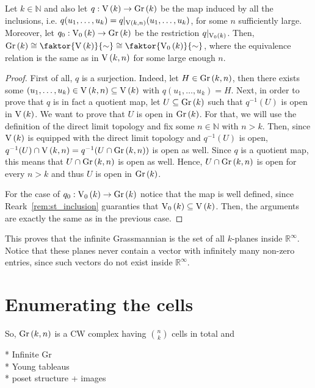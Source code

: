 \begin{proposition} Let $k\in\mathbb{N}$ and also let $q:\St{k}\to\Gr{k}$ be the map induced by all the inclusions, i.e. $q(u_1,\ldots,u_k)=q|_{\St{k}{n}}(u_1,\ldots,u_k)$, for some $n$ sufficiently large. Moreover, let $q_0:\StO{k}\to\Gr{k}$ be the restriction $q|_{\StO{k}}$. Then, $\Gr{k}\cong\faktor{\St{k}}{\sim}\cong\faktor{\StO{k}}{\sim}$, where the equivalence relation is the same as in $\St{k}{n}$ for some large enough $n$.
\end{proposition}
\begin{proof} First of all, $q$ is a surjection. Indeed, let $H\in\Gr{k}{n}$, then there exists some $(u_1,\ldots,u_k)\in\St{k}{n}\subseteq\St{k}$ with $q(u_1,\ldots,u_k)=H$. Next, in order to prove that $q$ is in fact a quotient map, let $U\subseteq\Gr{k}$ such that $q^{-1}(U)$ is open in $\St{k}$. We want to prove that $U$ is open in $\Gr{k}$. For that, we will use the definition of the direct limit topology and fix some $n\in\mathbb{N}$ with $n>k$. Then, since $\St{k}$ is equipped with the direct limit topology and $q^{-1}(U)$ is open, $q^{-1}(U)\cap\St{k}{n}=q^{-1}(U\cap\Gr{k}{n})$ is open as well. Since $q$ is a quotient map, this means that $U\cap\Gr{k}{n}$ is open as well. Hence, $U\cap\Gr{k}{n}$ is open for every $n>k$ and thus $U$ is open in $\Gr{k}$.

For the case of $q_0:\StO{k}\to\Gr{k}$ notice that the map is well defined, since Reark~\ref{rem:st_inclusion} guaranties that $\StO{k}\subseteq\St{k}$. Then, the arguments are exactly the same as in the previous case.
\end{proof}
\begin{remark} This proves that the infinite Grassmannian is the set of all $k$-planes inside $\mathbb{R}^{\infty}$. Notice that these planes never contain a vector with infinitely many non-zero entries, since such vectors do not exist inside $\mathbb{R}^{\infty}$.
\end{remark}

\section{Enumerating the cells}

So, $\Gr{k}{n}$ is a CW complex having $\binom{n}{k}$ cells in total and



* Infinite Gr\\
* Young tableaus\\
* poset structure + images\\


